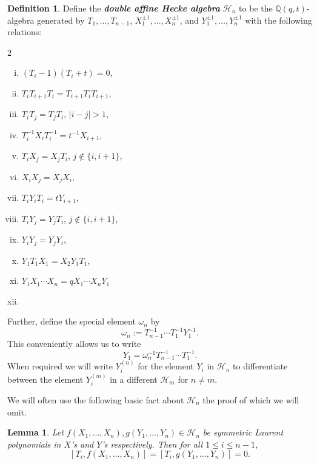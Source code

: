 \documentclass[11pt]{article}
\newtheorem{lemm}[theo]{Lemma}
\theoremstyle{definition}
\newtheorem{defi}[theo]{Definition}
\numberwithin{equation}{section}
\begin{document}
\begin{defi} \label{defn1}
Define the \textbf{\textit{double affine Hecke algebra}} $\mathscr{H}_n$ to be the $\mathbb{Q}(q,t)$-algebra generated by $T_1,\ldots,T_{n-1}$, $X_1^{\pm 1},\ldots,X_{n}^{\pm 1}$, and $Y_1^{\pm 1},\ldots,Y_n^{\pm 1}$ with the following relations:



\begin{multicols}{2}
\begin{enumerate}[(i)]
    \item  
    \label{def-i} 
    $(T_i -1)(T_i +t) = 0$,
    \item [] $T_iT_{i+1}T_i = T_{i+1}T_iT_{i+1}$,
    \item [] $T_iT_j = T_jT_i$, $|i-j|>1$,
    \item 
    \label{def-ii} $T_i^{-1}X_iT_i^{-1} = t^{-1}X_{i+1}$,
    \item []$T_iX_j = X_jT_i$, $j \notin \{i,i+1\}$,
    \item []$X_iX_j = X_jX_i$,
    \item 
    \label{def-iii}$T_iY_iT_i = tY_{i+1}$,
    \item []$T_iY_j = Y_jT_i$, $j\notin \{i,i+1\}$,
    \item []$Y_iY_j = Y_jY_i$,
    \item 
    \label{def-iv}$Y_1T_1X_1 = X_2Y_1T_1$,
    \item 
    \label{def-v}$Y_1X_1\cdots X_n = qX_1\cdots X_nY_1$
    \item []
\end{enumerate}
\end{multicols}


Further, define the special element $\omega_n$ by $$\omega_n := T_{n-1}^{-1}\cdots T_1^{-1}Y_1^{-1}.$$ This conveniently allows us to write $$Y_1 = \omega_n^{-1}T_{n-1}^{-1}\cdots T_1^{-1}.$$ When required we will write $Y_i^{(n)}$ for the element $Y_i$ in $\mathscr{H}_n$ to differentiate between the element $Y_i^{(m)}$ in a different $\mathscr{H}_m$ for $n \neq m$.
\end{defi}

We will often use the following basic fact about $\mathscr{H}_n$ the proof of which we will omit. 

\begin{lemm} \label{sym x and y commute with T's}
    Let $f(X_1,\ldots,X_n), g(Y_1,\ldots, Y_n) \in \mathscr{H}_n$ be symmetric Laurent polynomials in $X$'s and $Y$'s respectively. Then for all $1 \leq i \leq n-1$, 
    $$[T_i,f(X_1,\ldots,X_n)] = [T_i,g(Y_1,\ldots, Y_n)] = 0.$$
\end{lemm}
\end{document}
